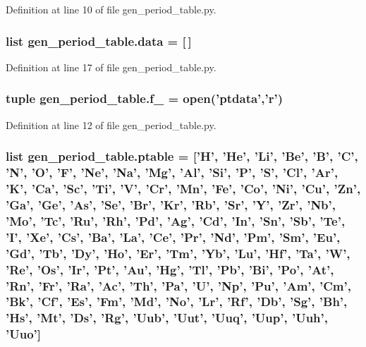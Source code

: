Definition at line 10 of file gen\+\_\+period\+\_\+table.\+py.

\hypertarget{namespacegen__period__table_aa362c3231b0e20bb880ab0ccd81a97eb}{
\subsubsection[{data}]{\setlength{\rightskip}{0pt plus 5cm}list gen\+\_\+period\+\_\+table.\+data = \mbox{[}$\,$\mbox{]}}}\label{namespacegen__period__table_aa362c3231b0e20bb880ab0ccd81a97eb}


Definition at line 17 of file gen\+\_\+period\+\_\+table.\+py.

\hypertarget{namespacegen__period__table_ac1b050e937df5a51b9ffb47de6287d6b}{
\subsubsection[{f\+\_\+}]{\setlength{\rightskip}{0pt plus 5cm}tuple gen\+\_\+period\+\_\+table.\+f\+\_\+ = open('ptdata','r')}}\label{namespacegen__period__table_ac1b050e937df5a51b9ffb47de6287d6b}


Definition at line 12 of file gen\+\_\+period\+\_\+table.\+py.

\hypertarget{namespacegen__period__table_affcfd8286c3b181d6632fcd6a69c2a41}{
\subsubsection[{ptable}]{\setlength{\rightskip}{0pt plus 5cm}list gen\+\_\+period\+\_\+table.\+ptable = \mbox{[}'H', 'He', 'Li', 'Be', 'B', 'C', 'N', 'O', 'F', 'Ne', 'Na', 'Mg', 'Al', 'Si', 'P', 'S', 'Cl', 'Ar', 'K', 'Ca', 'Sc', 'Ti', 'V', 'Cr', 'Mn', 'Fe', 'Co', 'Ni', 'Cu', 'Zn', 'Ga', 'Ge', 'As', 'Se', 'Br', 'Kr', 'Rb', 'Sr', 'Y', 'Zr', 'Nb', 'Mo', 'Tc', 'Ru', 'Rh', 'Pd', 'Ag', 'Cd', 'In', 'Sn', 'Sb', 'Te', 'I', 'Xe', 'Cs', 'Ba', 'La', 'Ce', 'Pr', 'Nd', 'Pm', 'Sm', 'Eu', 'Gd', 'Tb', 'Dy', 'Ho', 'Er', 'Tm', 'Yb', 'Lu', 'Hf', 'Ta', 'W', 'Re', 'Os', 'Ir', 'Pt', 'Au', 'Hg', 'Tl', 'Pb', 'Bi', 'Po', 'At', 'Rn', 'Fr', 'Ra', 'Ac', 'Th', 'Pa', 'U', 'Np', 'Pu', 'Am', 'Cm', 'Bk', 'Cf', 'Es', 'Fm', 'Md', 'No', 'Lr', 'Rf', 'Db', 'Sg', 'Bh', 'Hs', 'Mt', 'Ds', 'Rg', 'Uub', 'Uut', 'Uuq', 'Uup', 'Uuh', 'Uuo'\mbox{]}}}\label{namespacegen__period__table_affcfd8286c3b181d6632fcd6a69c2a41}


